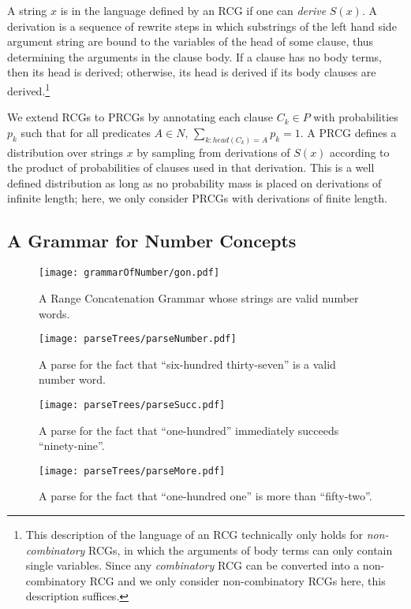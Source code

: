 \documentclass[10pt,letterpaper]{article}
\begin{document}
A string $x$ is in the language defined by an RCG if one can
\emph{derive} $S(x)$. A derivation is a sequence of rewrite steps in
which substrings of the left hand side argument string are bound to
the variables of the head of some clause, thus determining the
arguments in the clause body. If a clause has no body terms, then its
head is derived; otherwise, its head is derived if its body clauses
are derived.\footnote{This description of the language of an RCG
  technically only holds for \emph{non-combinatory} RCGs, in which the
  arguments of body terms can only contain single variables. Since any
  \emph{combinatory} RCG can be converted into a non-combinatory RCG
  and we only consider non-combinatory RCGs here, this description
  suffices.}

We extend RCGs to PRCGs by annotating each clause $C_k \in P$ with
probabilities $p_k$ such that for all predicates ${A \in N, \,
  \sum_{k:head(C_k)=A} p_k = 1}$. A PRCG defines a distribution over
strings $x$ by sampling from derivations of $S(x)$ according to the
product of probabilities of clauses used in that derivation. This is a
well defined distribution as long as no probability mass is placed on
derivations of infinite length; here, we only consider PRCGs with
derivations of finite length.

\subsection{A Grammar for Number Concepts}

\begin{figure*}[t]
		\texttt{[image: grammarOfNumber/gon.pdf]}
		\caption{A Range Concatenation Grammar whose strings are valid number words.}
		\label{fig:gon}
\end{figure*}

\begin{figure*}[t]
		\texttt{[image: parseTrees/parseNumber.pdf]}
		\caption{A parse for the fact that ``six-hundred thirty-seven'' is a valid number word.}
		\label{fig:parseNumber}
\end{figure*}

\begin{figure*}[t]
		\texttt{[image: parseTrees/parseSucc.pdf]}
		\caption{A parse for the fact that ``one-hundred'' immediately succeeds ``ninety-nine''.}
		\label{fig:parseSucc}
\end{figure*}

\begin{figure*}[t]
		\texttt{[image: parseTrees/parseMore.pdf]}
		\caption{A parse for the fact that ``one-hundred one'' is more than ``fifty-two''.}
		\label{fig:parseMore}
\end{figure*}
\end{document}
